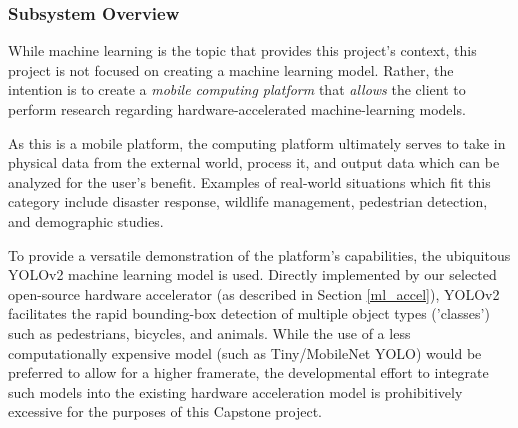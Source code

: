 
% 

\subsubsection{Subsystem Overview} \label{ml_desc}
While machine learning is the topic that provides this project's context, this project is not focused on creating a machine learning model. Rather, the intention is to create a \textit{mobile computing platform} that \textit{allows} the client to perform research regarding hardware-accelerated machine-learning models.

As this is a mobile platform, the computing platform ultimately serves to take in physical data from the external world, process it, and output data which can be analyzed for the user's benefit. Examples of real-world situations which fit this category include disaster response, wildlife management, pedestrian detection, and demographic studies.

To provide a versatile demonstration of the platform's capabilities, the ubiquitous YOLOv2 machine learning model is used. Directly implemented by our selected open-source hardware accelerator (as described in Section \ref{ml_accel}), YOLOv2 facilitates the rapid bounding-box detection of multiple object types ('classes') such as pedestrians, bicycles, and animals. While the use of a less computationally expensive model (such as Tiny/MobileNet YOLO) would be preferred to allow for a higher framerate, the developmental effort to integrate such models into the existing hardware acceleration model is prohibitively excessive for the purposes of this Capstone project.


